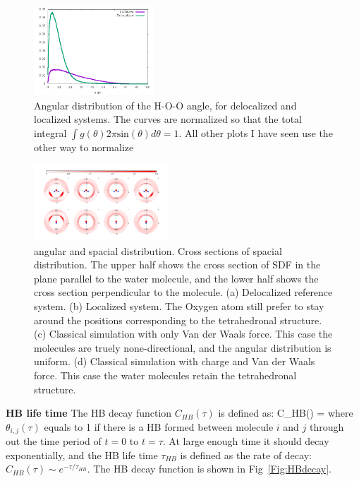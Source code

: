 \documentclass[prl,twocolumn,showpacs]{revtex4}
\begin{document}
\begin{figure}
\includegraphics[width=0.4\textwidth]{angular_dist}
\caption{Angular distribution of the H-O-O angle, for delocalized and localized systems. The curves are normalized so that the total integral $\int g(\theta)2\pi \text{sin}(\theta)d\theta = 1$. \new All other plots I have seen use the other way to normalize \old} \label{Fig:ADF}
\end{figure}

\begin{figure}
\includegraphics[width=0.45\textwidth]{SDF}
\caption{angular and spacial distribution. Cross sections of spacial distribution. The upper half shows the cross section of SDF in the plane parallel to the water molecule, and the lower half shows the cross section perpendicular to the molecule. (a) Delocalized reference system. (b) Localized system. The Oxygen atom still prefer to stay around the positions corresponding to the tetrahedronal structure. (c) Classical simulation with only Van der Waals force. This case the molecules are truely none-directional, and the angular distribution is uniform. (d) Classical simulation with charge and Van der Waals force. This case the water molecules retain the tetrahedronal structure. } \label{Fig:SDF}
\end{figure}

\textbf{HB life time}
The HB decay function $C_{HB}(\tau)$ is defined as:
\bea
C_{HB}(\tau) =  \label{Eq:HBdecay}
\eea
where $\theta_{i,j}(\tau)$ equals to 1 if there is a HB formed between molecule $i$ and $j$ through out the time period of $t=0$ to $t=\tau$. At large enough time it should decay exponentially, and the HB life time $\tau_{HB}$ is defined as the rate of decay: $C_{HB}(\tau) \sim e^{-\tau/\tau_{HB}}$. The HB decay function is shown in Fig~\ref{Fig:HBdecay}.
\end{document}
